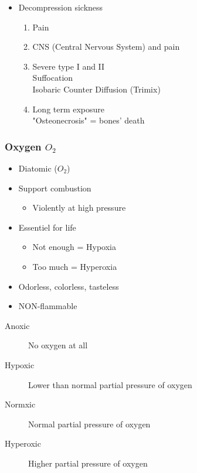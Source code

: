 \documentclass[aspectratio=1610,english,12pt]{beamer}
\begin{document}
\begin{frame}{\insertsubsubsection}
	\begin{itemize}
		\item Decompression sickness
		\begin{enumerate}[I]
			\item Pain
			\item CNS (Central Nervous System) and pain
			\item Severe type I and II \\ Suffocation \\ Isobaric Counter Diffusion (Trimix)
			\item Long term exposure \\ "Osteonecrosis" = bones' death
		\end{enumerate}
	\end{itemize}
\end{frame}

\subsubsection{Oxygen {$O_2$}}
\begin{frame}{\insertsubsubsection}
	\begin{itemize}
		\item Diatomic ($O_2$)
		\item Support combustion
		\begin{itemize}
			\item Violently at high pressure
		\end{itemize}
		\item Essentiel for life
		\begin{itemize}
			\item Not enough = Hypoxia
			\item Too much = Hyperoxia
		\end{itemize}
		\item Odorless, colorless, tasteless
		\item NON-flammable
	\end{itemize}
\end{frame}

\begin{frame}{\insertsubsubsection}
	\begin{description}
		\item[Anoxic]No oxygen at all
		\item[Hypoxic]Lower than normal partial pressure of oxygen
		\item[Normxic]Normal partial pressure of oxygen
		\item[Hyperoxic]Higher partial pressure of oxygen
	\end{description}
\end{frame}
\end{document}
